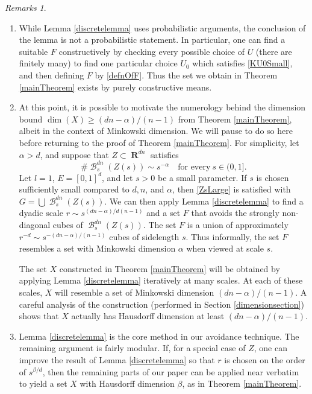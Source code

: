 \documentclass[dvipsnames,letterpaper,12pt]{article}
\numberwithin{equation}{section}
\theoremstyle{plain}
\theoremstyle{remark}
\newtheorem*{remarks}{Remarks}
\DeclareMathOperator{\RR}{\mathbf{R}}
\DeclareMathOperator{\B}{\mathcal{B}}
\begin{document}
\begin{remarks}
	\
	\begin{enumerate}[1.]
		\item While Lemma \ref{discretelemma} uses probabilistic arguments, the conclusion of the lemma is not a probabilistic statement. In particular, one can find a suitable $F$ constructively by checking every possible choice of $U$ (there are finitely many) to find one particular choice $U_0$ which satisfies \eqref{KU0Small}, and then defining $F$ by \eqref{defnOfF}. Thus the set we obtain in Theorem \ref{mainTheorem} exists by purely constructive means.
		
		\item At this point, it is possible to motivate the numerology behind the dimension bound $\dim(X) \geq (dn-\alpha)/(n-1)$ from Theorem \ref{mainTheorem}, albeit in the context of Minkowski dimension. We will pause to do so here before returning to the proof of Theorem \ref{mainTheorem}. For simplicity, let $\alpha > d$, and suppose that $Z \subset \RR^{dn}$ satisfies 
		\begin{equation}\label{specialCase}
			\#\B_{s}^{dn}(Z(s)) \sim s^{-\alpha} \quad \textrm{for every}\ s \in (0,1].
		\end{equation}
		Let $l = 1$, $E = [0,1]^d$, and let $s > 0$ be a small parameter. If $s$ is chosen sufficiently small compared to $d,n$, and $\alpha$, then \eqref{ZsLarge} is satisfied with $G = \bigcup \B^{dn}_s(Z(s))$. We can then apply Lemma \ref{discretelemma} to find a dyadic scale $r \sim s^{(dn-\alpha)/d(n-1)}$ and a set $F$ that avoids the strongly non-diagonal cubes of $\B_{s}^{dn}(Z(s))$. The set $F$ is a union of approximately $r^{-d} \sim s^{-(dn-\alpha)/(n-1)}$ cubes of sidelength $s$. Thus informally, the set $F$ resembles a set with Minkowski dimension $\alpha$ when viewed at scale $s$. 

		The set $X$ constructed in Theorem \ref{mainTheorem} will be obtained by applying Lemma \ref{discretelemma} iteratively at many scales. At each of these scales, $X$ will resemble a set of Minkowski dimension $(dn - \alpha)/(n-1)$. A careful analysis of the construction (performed in Section \ref{dimensionsection}) shows that $X$ actually has Hausdorff dimension at least $(dn - \alpha)/(n-1)$.

		\item Lemma \ref{discretelemma} is the core method in our avoidance technique. The remaining argument is fairly modular. If, for a special case of $Z$, one can improve the result of Lemma \ref{discretelemma} so that $r$ is chosen on the order of $s^{\beta/d}$, then the remaining parts of our paper can be applied near verbatim to yield a set $X$ with Hausdorff dimension $\beta$, as in Theorem \ref{mainTheorem}. 
	\end{enumerate} 
\end{remarks}
\end{document}
